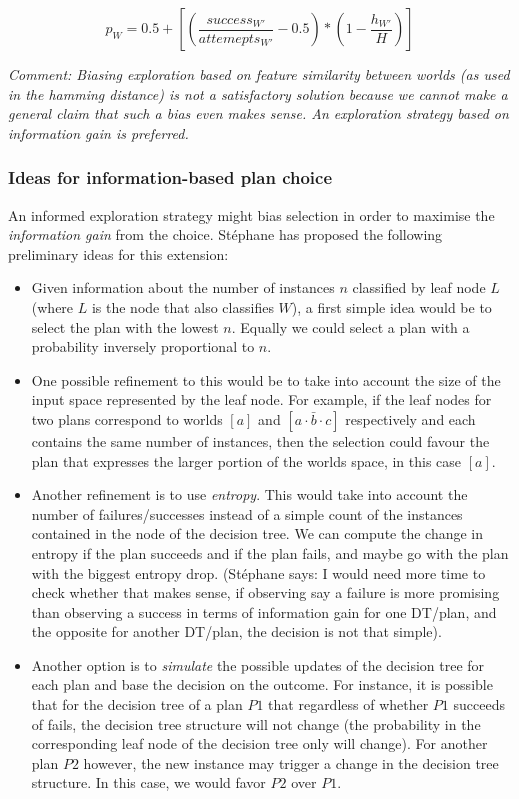 \documentclass[a4paper]{article}
\newcommand{\dt}{{decision tree}\xspace}
\newcommand{\stephane}{{St\'ephane}\xspace}
\begin{document}
\begin{equation}
\label{eqn:hdist}   
p_W= 0.5 + \left[ \left( \frac{{success_{W'}}}{attemepts_{W'}} - 0.5 \right) *  \left( 1 - \frac{h_{W'}}{H} \right)  \right]
\end{equation}

\textit{Comment: Biasing exploration based on feature similarity between worlds (as used in the hamming distance) is not a satisfactory solution because we cannot make a general claim that such a bias even makes sense. An exploration strategy based on information gain is preferred.}

\subsubsection{Ideas for information-based plan choice}

An informed exploration strategy might bias selection in order to maximise the \textit{information gain} from the choice. \stephane has proposed the following preliminary ideas for this extension:

\begin{itemize}
\item Given information about the number of instances $n$ classified by leaf node $L$ (where $L$ is the node that also classifies $W$), a first simple idea would be to select the plan with the lowest $n$. Equally we could select a plan with a probability inversely proportional to $n$.
\item One possible refinement to this would be to take into account the size of the input space represented by the leaf node. For example, if the leaf nodes for two plans correspond to worlds $[a]$ and $[a \cdot \bar{b} \cdot c]$ respectively and each contains the same number of instances, then the selection could favour the plan that expresses the larger portion of the worlds space, in this case $[a]$.
\item Another refinement is to use \textit{entropy}. This would take into account the number of failures/successes instead of a simple count of the instances contained in the node of the \dt. We can compute the change in entropy if the plan succeeds and if the plan fails, and maybe go with the plan with the biggest entropy drop. (\stephane says: I would need more time to check whether that makes sense, if observing say a failure is more promising than observing a success in terms of information gain for one DT/plan, and the opposite for another DT/plan, the decision is not that simple).
\item Another option is to \textit{simulate} the possible updates of the decision tree for each plan and base the decision on the outcome. For instance, it is possible that for the \dt of a plan $P1$ that regardless of whether $P1$ succeeds of fails, the \dt structure will not change (the probability in the corresponding leaf node of the \dt only will change). For another plan $P2$ however, the new instance may trigger a change in the \dt structure. In this case, we would favor $P2$ over $P1$.
\end{itemize}
\end{document}
